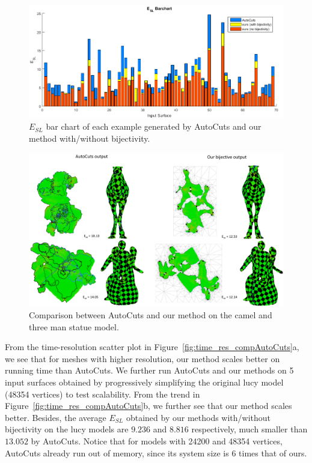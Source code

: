 \begin{figure}[!h]
\centering
\includegraphics[width=\linewidth]{fig/ESLBar_compAutoCuts.png}
\caption{$E_{SL}$ bar chart of each example generated by AutoCuts and our method with/without bijectivity.}
\label{fig:ESLBar_compAutoCuts}
\end{figure}

\begin{figure}[!h]
\centering
\includegraphics[width=\linewidth]{fig/comp_AutoCuts.png}
\caption{Comparison between AutoCuts and our method on the camel and three man statue model.}
\label{fig:comp_AutoCuts}
\end{figure}

From the time-resolution scatter plot in Figure~\ref{fig:time_res_compAutoCuts}a, we see that for meshes with higher resolution, our method scales better on running time than AutoCuts.
We further run AutoCuts and our methods on 5 input surfaces obtained by progressively simplifying the original lucy model (48354 vertices) to test scalability. From the trend in Figure~\ref{fig:time_res_compAutoCuts}b, we further see that our method scales better. Besides, the average $E_{SL}$ obtained by our methods with/without bijectivity on the lucy models are $9.236$ and $8.816$ respectively, much smaller than $13.052$ by AutoCuts. Notice that for models with 24200 and 48354 vertices, AutoCuts already run out of memory, since its system size is $6$ times that of ours.

